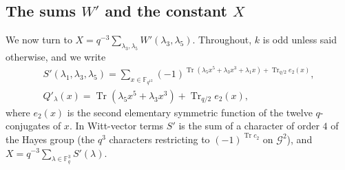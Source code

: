 \documentclass[11pt,a4paper]{amsart}
\theoremstyle{definition}
\newcommand{\F}{\mathbb{F}}
\newcommand{\G}{\mathcal{G}}
\newcommand{\Tr}{\operatorname{Tr}}
\begin{document}
\subsection{The sums \texorpdfstring{$W'$}{W'} and the constant \texorpdfstring{$X$}{X}}\label{subsec:Wp}
We now turn to $X=q^{-3}\sum_{\lambda_3,\lambda_5}W'(\lambda_3,\lambda_5)$. Throughout, $k$ is odd unless said otherwise, and we write
\begin{gather*}
S'(\lambda_1,\lambda_3,\lambda_5)=\sum_{x\in\F_{q^{12}}}(-1)^{\Tr(\lambda_5x^5+\lambda_3x^3+\lambda_1x)+\Tr_{q/2}e_2(x)},\\
Q'_\lambda(x)=\Tr(\lambda_5x^5+\lambda_3x^3)+\Tr_{q/2}e_2(x),
\end{gather*}
where $e_2(x)$ is the second elementary symmetric function of the twelve $q$-conjugates of $x$. In Witt-vector terms $S'$ is the sum of a character of order $4$ of the Hayes group (the $q^3$ characters restricting to $(-1)^{\Tr c_2}$ on $\G^2$), and $X=q^{-3}\sum_{\lambda\in\F_q^3}S'(\lambda)$.
\end{document}
